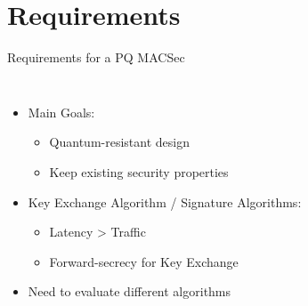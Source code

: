 \documentclass[fleqn,compress,utf8,aspectratio=169,t]{beamer}
\begin{document}

\section{Requirements}

\begin{frame}{Requirements for a PQ MACSec}
  \begin{columns}[T]
    \begin{itemize}
      \item Main Goals:
      \begin{itemize}
        \item Quantum-resistant design
        \item Keep existing security properties
      \end{itemize}
      \item<2-> Key Exchange Algorithm / Signature Algorithms:
      \begin{itemize}
        \item Latency > Traffic
        \item Forward-secrecy for Key Exchange
      \end{itemize}
      \item<3-> Need to evaluate different algorithms
    \end{itemize}
  \end{columns}
\end{frame}
\end{document}
